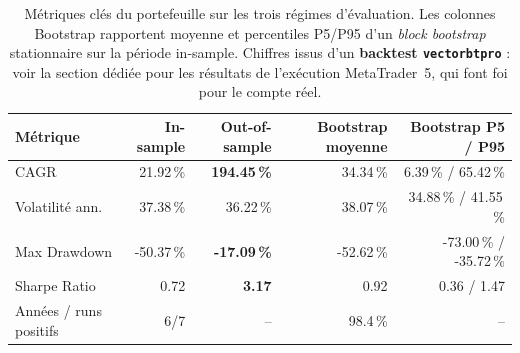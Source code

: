 \begin{table}[H]
\centering
\caption{Métriques clés du portefeuille sur les trois régimes d'évaluation. Les colonnes Bootstrap rapportent moyenne et percentiles P5/P95 d'un \emph{block bootstrap} stationnaire sur la période in-sample. Chiffres issus d'un \textbf{backtest \texttt{vectorbtpro}} : voir la section dédiée pour les résultats de l'exécution MetaTrader~5, qui font foi pour le compte réel.}
\label{tab:metrics_summary}
\begin{tabular}{lrrrr}
\toprule
Métrique & In-sample & Out-of-sample & Bootstrap moyenne & Bootstrap P5 / P95 \\
\midrule
CAGR & 21.92\,\% & \textbf{194.45\,\%} & 34.34\,\% & 6.39\,\% / 65.42\,\% \\
Volatilité ann. & 37.38\,\% & 36.22\,\% & 38.07\,\% & 34.88\,\% / 41.55\,\% \\
Max Drawdown & -50.37\,\% & \textbf{-17.09\,\%} & -52.62\,\% & -73.00\,\% / -35.72\,\% \\
Sharpe Ratio & 0.72 & \textbf{3.17} & 0.92 & 0.36 / 1.47 \\
Années / runs positifs & 6/7 & -- & 98.4\,\% & -- \\
\bottomrule
\end{tabular}
\end{table}
